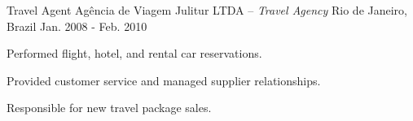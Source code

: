 \begin{cventries}
\cventry
{Travel Agent} %
{Agência de Viagem Julitur LTDA \textmd{-- \em{Travel Agency}}} %
{Rio de Janeiro, Brazil} %
{Jan. 2008 - Feb. 2010} %
{ %
\begin{cvitems}
\item{Performed flight, hotel, and rental car reservations.}
\item{Provided customer service and managed supplier relationships.}
\item{Responsible for new travel package sales.}
\end{cvitems}
}


\end{cventries}